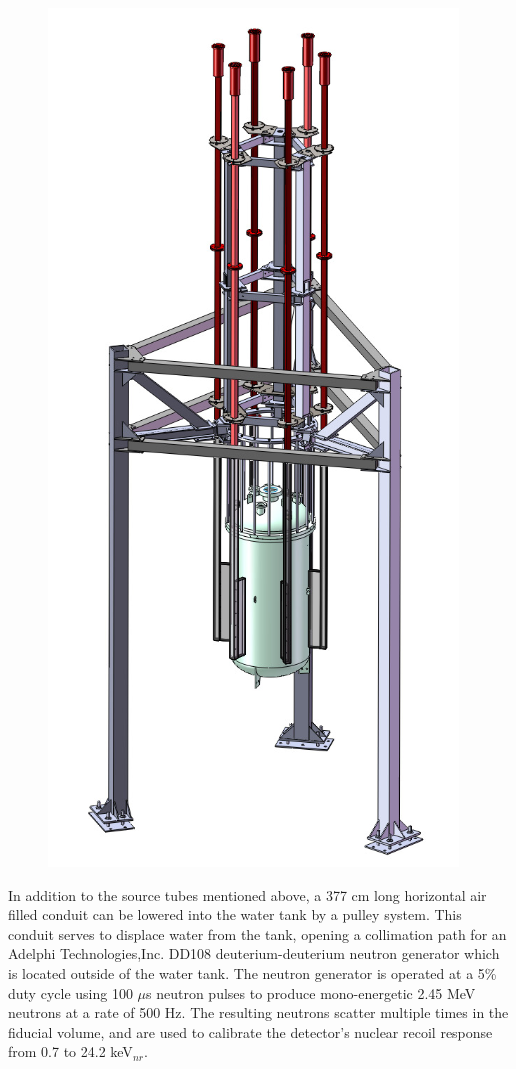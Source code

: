 \documentclass[a4paper,12pt]{article}
\begin{document}
\begin{figure} [!h]
\includegraphics[scale=.35]{LuxSourceTubes.png} 
\label{LuxSourceTubes}
\end{figure}

In addition to the source tubes mentioned above, a 377 cm long horizontal air filled conduit can be lowered into the water tank by a pulley system.   This conduit serves to displace water from the tank, opening a collimation path for an Adelphi Technologies,Inc. DD108  deuterium-deuterium neutron generator which is located outside of the water tank.  The neutron generator is operated at a 5\% duty cycle using 100 $\mu$s neutron pulses to produce mono-energetic 2.45 MeV neutrons at a rate of 500 Hz. The resulting neutrons scatter multiple times in the fiducial volume, and are used to calibrate the detector's nuclear recoil response from 0.7 to 24.2 keV$_{nr}$.
\end{document}
